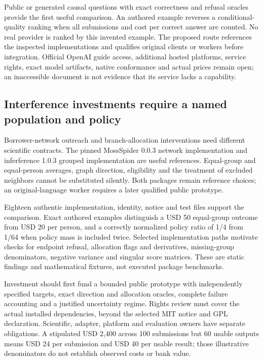 Public or generated causal questions with exact correctness and refusal
oracles provide the first useful comparison. An authored example
reverses a conditional-quality ranking when all submissions and cost per
correct answer are counted. No real provider is ranked by this invented
example. The proposed route references the inspected implementations and
qualifies original clients or workers before integration. Official
OpenAI guide access, additional hosted platforms, service rights, exact
model artifacts, native conformance and actual prices remain open; an
inaccessible document is not evidence that its service lacks a
capability. \citep{exec24_backend_reference}

\hypertarget{interference-investments-require-a-named-population-and-policy}{%
\subsection{Interference investments require a named population and
policy}\label{interference-investments-require-a-named-population-and-policy}}

Borrower-network outreach and branch-allocation interventions need
different scientific contracts. The pinned MossSpider 0.0.3 network
implementation and inferference 1.0.3 grouped implementation are useful
references. Equal-group and equal-person averages, graph direction,
eligibility and the treatment of excluded neighbors cannot be
substituted silently. Both packages remain reference choices; an
original-language worker requires a later qualified public prototype.
\citep{exec24_interference_mossspider,exec24_interference_inferference}

Eighteen authentic implementation, identity, notice and test files
support the comparison. Exact authored examples distinguish a USD 50
equal-group outcome from USD 20 per person, and a correctly normalized
policy ratio of 1/4 from 1/64 when policy mass is included twice.
Selected implementation paths motivate checks for endpoint refusal,
allocation flags and derivatives, missing-group denominators, negative
variance and singular score matrices. These are static findings and
mathematical fixtures, not executed package benchmarks.
\citep{exec24_interference_reference}

Investment should first fund a bounded public prototype with
independently specified targets, exact direction and allocation oracles,
complete failure accounting and a justified uncertainty regime. Rights
review must cover the actual installed dependencies, beyond the selected
MIT notice and GPL declaration. Scientific, adapter, platform and
evaluation owners have separate obligations. A stipulated USD 2,400
across 100 submissions but 60 usable outputs means USD 24 per submission
and USD 40 per usable result; those illustrative denominators do not
establish observed costs or bank value.
\citep{exec24_interference_mossspider,exec24_interference_inferference,exec24_interference_reference}

